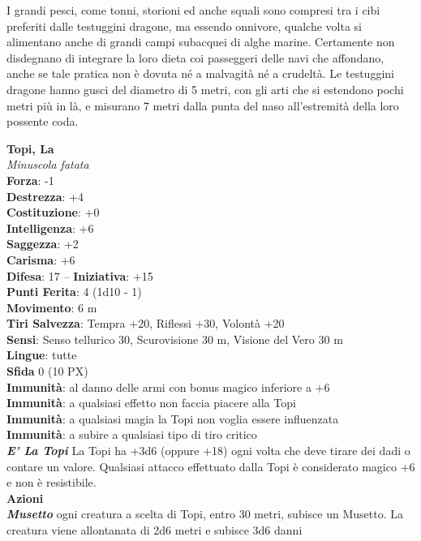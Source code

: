 \begin{multicols}{2}
I grandi pesci, come tonni, storioni ed anche squali sono compresi tra i cibi preferiti dalle testuggini dragone, ma essendo onnivore, qualche volta si alimentano anche di grandi campi subacquei di alghe marine. Certamente non disdegnano di integrare la loro dieta coi passeggeri delle navi che affondano, anche se tale pratica non è dovuta né a malvagità né a crudeltà. Le testuggini dragone hanno gusci del diametro di 5 metri, con gli arti che si estendono pochi metri più in là, e misurano 7 metri dalla punta del naso all'estremità della loro possente coda.

\medskip\textbf{Topi, La}\\
\textit{Minuscola fatata}\\
\textbf{Forza}: -1\\
\textbf{Destrezza}: +4\\
\textbf{Costituzione}: +0\\
\textbf{Intelligenza}: +6\\
\textbf{Saggezza}: +2\\
\textbf{Carisma}: +6\\
\textbf{Difesa}: 17 -- \textbf{Iniziativa}: +15\\
\textbf{Punti Ferita}: 4 (1d10 - 1)\\
\textbf{Movimento}: 6 m\\
\textbf{Tiri Salvezza}: Tempra +20, Riflessi +30, Volontà +20 \\
\textbf{Sensi}: Senso tellurico 30, Scurovisione 30 m, Visione del Vero 30 m\\
\textbf{Lingue}: tutte\\
\textbf{Sfida} 0 (10 PX)\\
\textbf{Immunità}: al danno delle armi con bonus magico inferiore a +6\\
\textbf{Immunità}: a qualsiasi effetto non faccia piacere alla Topi\\
\textbf{Immunità}: a qualsiasi magia la Topi non voglia essere influenzata\\
\textbf{Immunità}: a subire a qualsiasi tipo di tiro critico\\
\textit{\textbf{E' La Topi}} La Topi ha +3d6 (oppure +18) ogni volta che deve tirare dei dadi o contare un valore.
Qualsiasi attacco effettuato dalla Topi è considerato magico +6 e non è resistibile.\\
\textbf{Azioni}\\
\textit{\textbf{Musetto}} ogni creatura a scelta di Topi, entro 30 metri, subisce un Musetto. La creatura viene allontanata di 2d6 metri e subisce 3d6 danni\\

\end{multicols}
